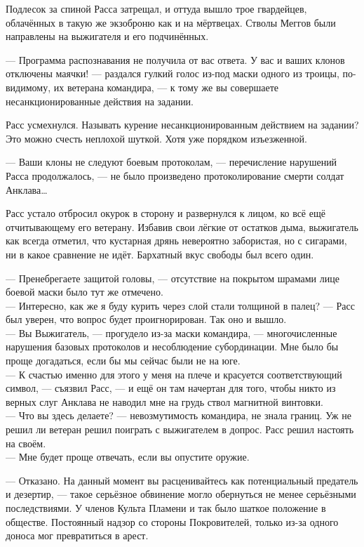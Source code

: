 Подлесок за спиной Расса затрещал, и оттуда вышло трое гвардейцев, облачённых в 
такую же экзоброню как и на мёртвецах. Стволы Меггов были направлены на 
выжигателя и его подчинённых.

\noindent --- Программа распознавания не получила от вас ответа. У вас и ваших 
клонов отключены маячки! --- раздался гулкий голос из-под маски одного из 
троицы, по-видимому, их ветерана командира, --- к тому же вы совершаете 
несанкционированные действия на задании.

Расс усмехнулся. Называть курение несанкционированным действием на задании? Это 
можно счесть неплохой шуткой. Хотя уже порядком изъезженной.

\noindent --- Ваши клоны не следуют боевым протоколам, --- перечисление 
нарушений Расса продолжалось, --- не было произведено протоколирование смерти 
солдат Анклава\ldots

Расс устало отбросил окурок в сторону и развернулся к лицом, ко всё ещё 
отчитывающему его ветерану. Избавив свои лёгкие от остатков дыма, выжигатель как 
всегда отметил, что кустарная дрянь невероятно забористая, но с сигарами, ни в 
какое сравнение не идёт. Бархатный вкус свободы был всего один.

\noindent --- Пренебрегаете защитой головы, --- отсутствие на покрытом шрамами 
лице боевой маски было тут же отмечено.\\
--- Интересно, как же я буду курить через слой стали толщиной в палец? --- Расс 
был уверен, что вопрос будет проигнорирован. Так оно и вышло.\\
--- Вы Выжигатель, --- прогудело из-за маски командира, --- многочисленные 
нарушения базовых протоколов и несоблюдение субординации. Мне было бы проще 
догадаться, если бы мы сейчас были не на юге.\\
--- К счастью именно для этого у меня на плече и красуется соответствующий 
символ, --- съязвил Расс, --- и ещё он там начертан для того, чтобы никто из 
верных слуг Анклава не наводил мне на грудь ствол магнитной винтовки.\\
--- Что вы здесь делаете? --- невозмутимость командира, не знала границ. Уж не 
решил ли ветеран решил поиграть с выжигателем в допрос. Расс решил настоять на 
своём.\\
--- Мне будет проще отвечать, если вы опустите оружие.

\noindent --- Отказано. На данный момент вы расценивайтесь как потенциальный 
предатель и дезертир, --- такое серьёзное обвинение могло обернуться не менее 
серьёзными последствиями. У членов Культа Пламени и так было шаткое положение в 
обществе. Постоянный надзор со стороны Покровителей, только из-за одного доноса 
мог превратиться в арест. 

